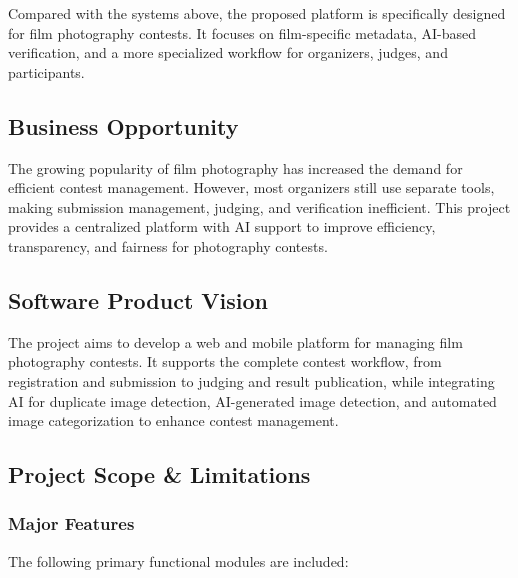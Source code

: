 Compared with the systems above, the proposed platform is specifically designed for film photography contests. It focuses on film-specific metadata, AI-based verification, and a more specialized workflow for organizers, judges, and participants.

\subsection{Business Opportunity}
\label{subsec:business_opportunity}
\begingroup
\setlength{\parindent}{1.5em}
\setlength{\parskip}{0.8em}

The growing popularity of film photography has increased the demand for efficient contest management. However, most organizers still use separate tools, making submission management, judging, and verification inefficient. This project provides a centralized platform with AI support to improve efficiency, transparency, and fairness for photography contests.
\endgroup

\subsection{Software Product Vision}
\label{subsec:software_product_vision}
\begingroup
\setlength{\parindent}{1.5em}
\setlength{\parskip}{0.8em}

The project aims to develop a web and mobile platform for managing film photography contests. It supports the complete contest workflow, from registration and submission to judging and result publication, while integrating AI for duplicate image detection, AI-generated image detection, and automated image categorization to enhance contest management.
\endgroup

\subsection{Project Scope \& Limitations}
\label{subsec:project_scope_limitations}

\subsubsection{Major Features}
\label{subsubsec:major_features}

The following primary functional modules are included:

